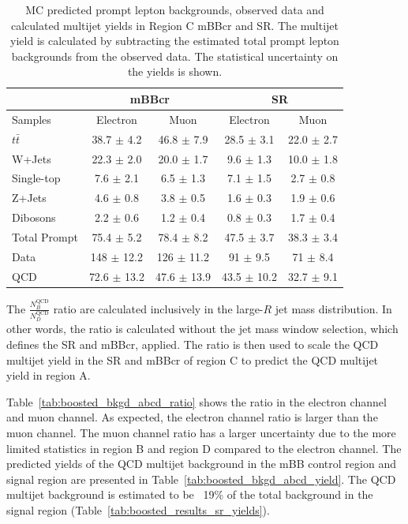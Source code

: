 \begin{table}
\begin{center}
\begin{tabular}{l|c|c||c|c}
             &\multicolumn{2}{c||}{mBBcr}               &\multicolumn{2}{c}{SR}\\
\hline
Samples       & Electron            & Muon               & Electron         & Muon     \\      
\hline
$t\bar{t}$    &  38.7   $\pm$ 4.2   & 46.8  $\pm$ 7.9    & 28.5 $\pm$ 3.1   & 22.0 $\pm$ 2.7  \\
W+Jets        &  22.3   $\pm$ 2.0   & 20.0  $\pm$ 1.7    &  9.6 $\pm$ 1.3   & 10.0 $\pm$ 1.8  \\        
Single-top    &   7.6   $\pm$ 2.1   &  6.5  $\pm$ 1.3    &  7.1 $\pm$ 1.5   &  2.7 $\pm$ 0.8  \\
Z+Jets        &   4.6   $\pm$ 0.8   &  3.8  $\pm$ 0.5    &  1.6 $\pm$ 0.3   &  1.9 $\pm$ 0.6  \\
Dibosons      &   2.2   $\pm$ 0.6   &  1.2  $\pm$ 0.4    &  0.8 $\pm$ 0.3   &  1.7 $\pm$ 0.4  \\
\hline
Total Prompt  &  75.4   $\pm$ 5.2   & 78.4  $\pm$ 8.2    & 47.5 $\pm$ 3.7   & 38.3 $\pm$ 3.4  \\
\hline
Data          &  148    $\pm$ 12.2  & 126   $\pm$ 11.2   & 91   $\pm$ 9.5   & 71   $\pm$ 8.4  \\
\hline
QCD           & 72.6    $\pm$ 13.2  &  47.6 $\pm$ 13.9   & 43.5 $\pm$ 10.2  & 32.7 $\pm$ 9.1  \\
\end{tabular}
\end{center}
\caption{MC predicted prompt lepton backgrounds, observed data and calculated multijet yields
in Region C mBBcr and SR. The multijet yield is calculated by subtracting the estimated total prompt lepton
backgrounds from the observed data. The statistical uncertainty on the yields is shown.}
\label{tab:boosted_region_c_promptbkgd_data}
\end{table}
 
The $\frac{N_B^\text{QCD}}{N_D^\text{QCD}}$ ratio are calculated inclusively in the large-$R$ jet mass distribution.
In other words, the ratio is calculated without the jet mass window selection, which defines the SR and mBBcr, applied.
The ratio is then used to scale the QCD multijet yield in the SR and mBBcr of region C to predict the QCD multijet yield
in region A.
 
Table~\ref{tab:boosted_bkgd_abcd_ratio} shows the ratio in the electron channel and muon channel. As expected,
the electron channel ratio is larger than the muon channel. The muon channel ratio has a larger uncertainty due to
the more limited statistics in region B and region D compared to the electron channel. The predicted yields of the QCD multijet background
in the mBB control region and signal region are presented in Table~\ref{tab:boosted_bkgd_abcd_yield}. The QCD multijet background is
estimated to be ~19\% of the total background in the signal region (Table~\ref{tab:boosted_results_sr_yields}).
 
